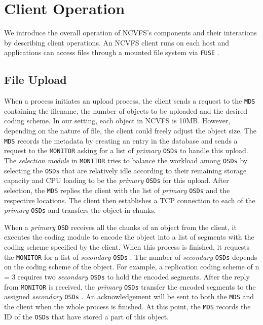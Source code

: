 \documentclass{article}
\def\osd{\texttt{OSD} }
\def\osds{\texttt{OSDs} }
\def\mds{\texttt{MDS} }
\def\fuse{\texttt{FUSE} }
\def\monitor{\texttt{MONITOR} }
\begin{document}
\section{Client Operation}
\label{client_ops}

We introduce the overall operation of NCVFS's components and their interations
by describing client operations. 
An NCVFS client runs on each host and applications can access files through a
mounted file system via \fuse.

\subsection{File Upload}

When a process initiates an upload process, the client sends a request to the \mds containing the filename, the number of objects 
to be uploaded and the desired coding scheme. In our setting, each object in NCVFS is 10MB. However, depending on 
the nature of file, the client could freely adjust the object size. The \mds records the metadata by creating an 
entry in the database and sends a request to the \monitor asking for a list of \textit{primary} \osds to handle this upload. 
The \textit{selection module}
in \monitor tries to balance the workload among \osds by selecting the \osds that are relatively idle according to 
their remaining storage capacity and CPU loading to be the \textit{primary} \osds for this upload. After selection, 
the \mds replies the client with the list of \textit{primary} \osds and the respective locations. The client then establishes a 
TCP connection to each of the \textit{primary} \osds and transfers the object in chunks.

When a \textit{primary} \osd receives all the chunks of an object from the client, it executes the coding module to encode the 
object into a list of segments with the coding scheme specified by the client. 
When this process is finished, it requests the \monitor for a list of 
\textit{secondary} \osds. The number of \textit{secondary} \osds depends on the coding scheme of the object. For example, a replication 
coding scheme of n = 3 requires two \textit{secondary} \osds to hold the encoded segments. After the reply from \monitor is received, the 
\textit{primary} \osds transfer the encoded segments to the assigned \textit{secondary} \osds. An acknowledgement will be sent to both the \mds and the client 
when the whole process is finished. At this point, the \mds records the ID of the \osds that have stored a part of this object.
\end{document}
